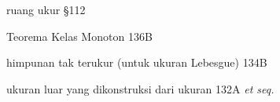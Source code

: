 ruang ukur \S112













Teorema Kelas Monoton 136B





\indexmedskip















himpunan tak terukur (untuk ukuran Lebesgue) 134B















\indexmedskip




















ukuran luar yang dikonstruksi dari ukuran 132A {\it et seq.}

